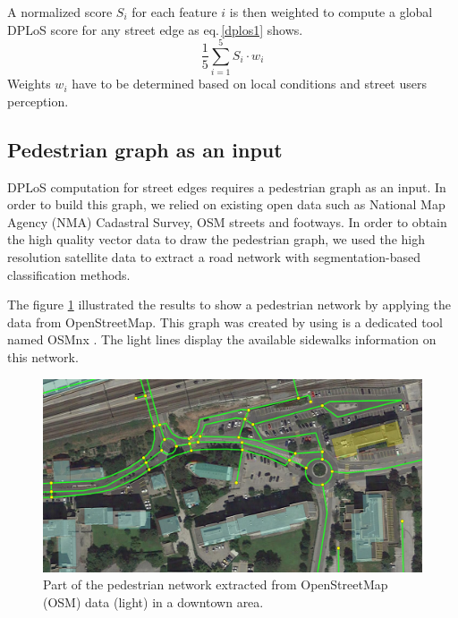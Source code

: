 \documentclass[10pt,conference,a4paper]{IEEEtran}
\begin{document}
A normalized score $S_{i}$ for each feature $i$ is then weighted to compute a global DPLoS score for any street edge as eq.\,\ref{dplos1} shows.
\begin{equation}
\frac{1}{5}\sum\limits_{i=1}^5 S_{i}\cdot{}w_{i}
\label{dplos1}
\end{equation}
Weights $w_{i}$ have to be determined based on local conditions and street users perception.
\subsection{Pedestrian graph as an input}
DPLoS computation for street edges requires a pedestrian graph as an input.
In order to build this graph, we relied on existing open data such as National Map Agency (NMA) Cadastral Survey, OSM streets and footways. In order to obtain the high quality vector data to draw the pedestrian graph, we used the high resolution satellite data to extract a road network with segmentation-based classification methods.

The figure \ref{pedestriangraph} illustrated the results to show a pedestrian network by applying the data from OpenStreetMap. This graph was created by using is a dedicated tool named OSMnx \cite{boeing_osmnx:_2017}. The light lines display the available sidewalks information on this network. 

\begin{figure}[ht]
\begin{center}
\includegraphics[width=1.0\linewidth]{OSM_walk_graph_022.jpg}
\end{center}
   \caption{Part of the pedestrian network extracted from OpenStreetMap (OSM) data (light) in a downtown area.}\label{pedestriangraph}
\end{figure}
\end{document}
